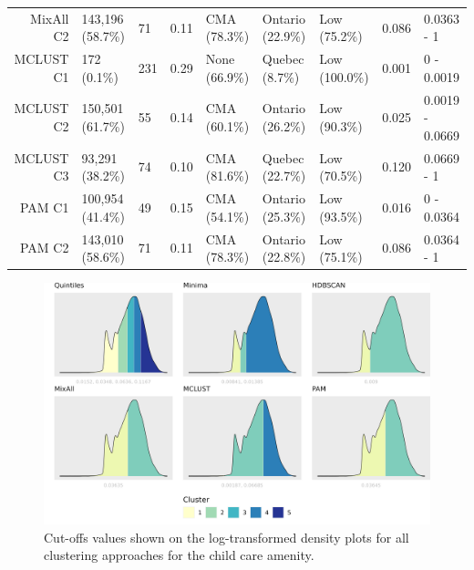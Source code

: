 \documentclass[11pt, a4paper]{article}
\begin{document}
\begin{table}[H]
{\begin{tabular}{|r|llllllll|}
  MixAll C2 & 143,196 (58.7\%) & 71 & 0.11 & CMA (78.3\%) & Ontario (22.9\%) & Low (75.2\%) & 0.086 & 0.0363 - 1 \\
\rowcolor{gray!25}  MCLUST C1 & 172 (0.1\%) & 231 & 0.29 & None (66.9\%) & Quebec (8.7\%) & Low (100.0\%) & 0.001 & 0 - 0.0019 \\
\rowcolor{gray!25}  MCLUST C2 & 150,501 (61.7\%) & 55 & 0.14 & CMA (60.1\%) & Ontario (26.2\%) & Low (90.3\%) & 0.025 & 0.0019 - 0.0669 \\
 \rowcolor{gray!25} MCLUST C3 & 93,291 (38.2\%) & 74 & 0.10 & CMA (81.6\%) & Quebec (22.7\%) & Low (70.5\%) & 0.120 & 0.0669 - 1 \\
  PAM C1 & 100,954 (41.4\%) & 49 & 0.15 & CMA (54.1\%) & Ontario (25.3\%) & Low (93.5\%) & 0.016 & 0 - 0.0364 \\
  PAM C2 & 143,010 (58.6\%) & 71 & 0.11 & CMA (78.3\%) & Ontario (22.8\%) & Low (75.1\%) & 0.086 & 0.0364 - 1 \\
   \hline
\end{tabular}
}
\end{table}





\begin{figure}[H]
\centering
\includegraphics[width=\textwidth]{./cutoffs/by_amenity/Child care_cutoffs.png}
\caption[Child care cutoffs]{Cut-offs values shown on the log-transformed density plots for all clustering approaches for the child care amenity.}\label{childcarecutoffs}
\end{figure}
\end{document}

